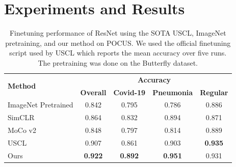 \section{Experiments and Results}
%
\begin{table}
\footnotesize
		\centering
		\setlength{\tabcolsep}{10pt}
		\begin{tabular}{lcccc}
		\toprule
		\multirow{2}{*}{\textbf{Method}} & \multicolumn{4}{c}{\textbf{Accuracy}} \\
		& \textbf{Overall} & \textbf{Covid-19} & \textbf{Pneumonia} & \textbf{Regular} \\
		\midrule
		ImageNet Pretrained & 0.842 & 0.795 & 0.786 & 0.886 \\
		SimCLR & 0.864 & 0.832 & 0.894 & 0.871 \\
		MoCo v2 & 0.848 & 0.797 & 0.814 & 0.889 \\
		USCL & 0.907 & 0.861 & 0.903 & \textbf{0.935 }\\
        \midrule
		Ours & \textbf{0.922} & \textbf{0.892} & \textbf{0.951} & 0.931 \\
		\bottomrule
		\end{tabular}
        \caption[Performance of the proposed method in Covid detection]{Finetuning performance of ResNet using the SOTA USCL, ImageNet pretraining, and our method on POCUS. We used the official finetuning script used by USCL which reports the mean accuracy over five runs. The pretraining was done on the Butterfly dataset.}
		\label{usucl_tab:pocus}
\end{table}
